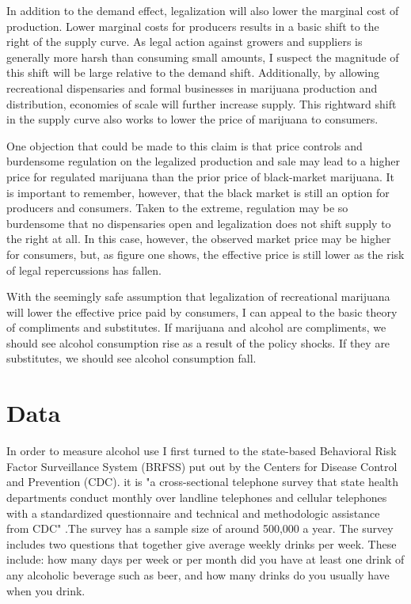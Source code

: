 \documentclass[11pt]{article}
\begin{document}
In addition to the demand effect, legalization will also lower the marginal cost of production. Lower marginal costs for producers results in a basic shift to the right of the supply curve. As legal action against growers and suppliers is generally more harsh than consuming small amounts, I suspect the magnitude of this shift will be large relative to the demand shift. Additionally, by allowing recreational dispensaries and formal businesses in marijuana production and distribution, economies of scale will further increase supply. This rightward shift in the supply curve also works to lower the price of marijuana to consumers. \par

One objection that could be made to this claim is that price controls and burdensome regulation on the legalized production and sale may lead to a higher price for regulated marijuana than the prior price of black-market marijuana. It is important to remember, however, that the black market is still an option for producers and consumers. Taken to the extreme, regulation may be so burdensome that no dispensaries open and legalization does not shift supply to the right at all. In this case, however, the observed market price may be higher for consumers, but, as figure one shows, the effective price is still lower as the risk of legal repercussions has fallen. \par
With the seemingly safe assumption that legalization of recreational marijuana will lower the effective price paid by consumers, I can appeal to the basic theory of compliments and substitutes. If marijuana and alcohol are compliments, we should see alcohol consumption rise as a result of the policy shocks. If they are substitutes, we should see alcohol consumption fall.\par





\section{Data}

In order to measure alcohol use I first turned to the state-based Behavioral Risk Factor Surveillance System (BRFSS) put out by the Centers for Disease Control and Prevention (CDC). it is "a cross-sectional telephone survey that state health departments conduct monthly over landline telephones and cellular telephones with a standardized questionnaire and technical and methodologic assistance from CDC" \cite{BRFSS_homepage}.The survey has a sample size of around 500,000 a year. The survey includes two questions that together give average weekly drinks per week. These include: how many days per week or per month did you have at least one drink of any alcoholic beverage such as beer, and how many drinks do you usually have when you drink. \par
\end{document}
